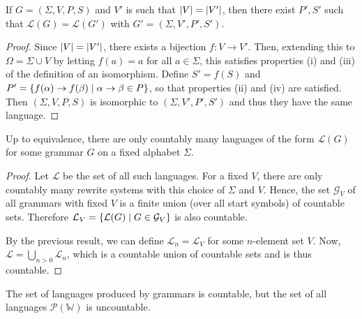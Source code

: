 \begin{proposition}
	If \( G = (\Sigma, V, P, S) \) and \( V' \) is such that \( \abs{V} = \abs{V'} \), then there exist \( P', S' \) such that \( \mathcal L(G) = \mathcal L(G') \) with \( G' = (\Sigma, V', P', S') \).
\end{proposition}
\begin{proof}
	Since \( \abs{V} = \abs{V'} \), there exists a bijection \( f \colon V \to V' \).
	Then, extending this to \( \Omega = \Sigma \cup V \) by letting \( f(a) = a \) for all \( a \in \Sigma \), this satisfies properties (i) and (iii) of the definition of an isomorphism.
	Define \( S' = f(S) \) and \( P' = \qty{f(\alpha) \to f(\beta) \mid \alpha \to \beta \in P} \), so that properties (ii) and (iv) are satisfied.
	Then \( (\Sigma, V, P, S) \) is isomorphic to \( (\Sigma, V', P', S') \) and thus they have the same language.
\end{proof}
\begin{proposition}
	Up to equivalence, there are only countably many languages of the form \( \mathcal L(G) \) for some grammar \( G \) on a fixed alphabet \( \Sigma \).
\end{proposition}
\begin{proof}
	Let \( \mathcal L \) be the set of all such languages.
	For a fixed \( V \), there are only countably many rewrite systems with this choice of \( \Sigma \) and \( V \).
	Hence, the set \( \mathcal G_V \) of all grammars with fixed \( V \) is a finite union (over all start symbols) of countable sets.
	Therefore \( \mathcal L_V = \qty{\mathcal L(G) \mid G \in \mathcal G_V} \) is also countable.

	By the previous result, we can define \( \mathcal L_n = \mathcal L_V \) for some \( n \)-element set \( V \).
	Now, \( \mathcal L = \bigcup_{n > 0} \mathcal L_n \), which is a countable union of countable sets and is thus countable.
\end{proof}
\begin{remark}
	The set of languages produced by grammars is countable, but the set of all languages \( \mathcal P(\mathbb W) \) is uncountable.
\end{remark}

